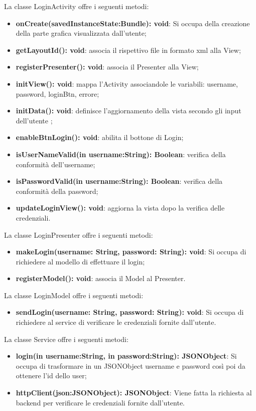 La classe LoginActivity offre i seguenti metodi:
\begin{itemize}
	\item \textbf{onCreate(savedInstanceState:Bundle): void}: Si occupa della creazione della parte grafica visualizzata dall'utente; 
	\item \textbf{getLayoutId(): void}: associa il rispettivo file in formato xml alla View;
	\item \textbf{registerPresenter(): void}: associa il Presenter alla View;
	\item \textbf{initView(): void}: mappa l'Activity associandole le variabili: username, password, loginBtn, errore;
	\item \textbf{initData(): void}: definisce l'aggiornamento della vista secondo gli input dell'utente ;
	\item \textbf{enableBtnLogin(): void}: abilita il bottone di Login;
	\item \textbf{isUserNameValid(in username:String): Boolean}: verifica della conformità dell'username;
	\item \textbf{isPasswordValid(in username:String): Boolean}: verifica della conformità della password;
	\item \textbf{updateLoginView(): void}: aggiorna la vista dopo la verifica delle credenziali.
\end{itemize}

La classe LoginPresenter offre i seguenti metodi:
\begin{itemize}
	\item \textbf{makeLogin(username: String, password: String): void}: Si occupa di richiedere al modello di effettuare il login; 
	\item \textbf{registerModel(): void}: associa il Model al Presenter.
\end{itemize}

La classe LoginModel offre i seguenti metodi:
\begin{itemize}
	\item \textbf{sendLogin(username: String, password: String): void}: Si occupa di richiedere al service di verificare le credenziali fornite dall'utente. 
\end{itemize}

La classe Service offre i seguenti metodi:
\begin{itemize}
	\item \textbf{login(in username:String, in password:String): JSONObject}: Si occupa di trasformare in un JSONObject username e password così poi da ottenere l'id dello user;
	\item \textbf{httpClient(json:JSONObject): JSONObject}: Viene fatta la richiesta al backend per verificare le credenziali fornite dall'utente.
	
\end{itemize}

